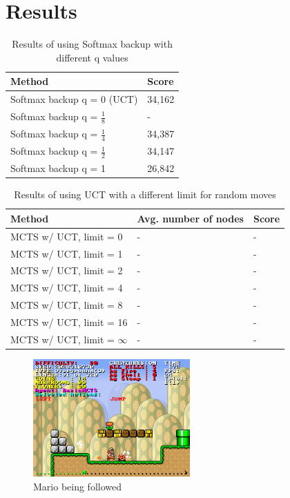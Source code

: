 \documentclass[10pt,a4paper]{article}
\begin{document}
\section{Results}
\renewcommand{\arraystretch}{1.5}

\begin{table}[h]
	\centering
\begin{tabular}{| l | l |}
	\hline
	\textbf{Method} & \textbf{Score} \\ \hline
	Softmax backup q = 0 (UCT) & 34,162 \\ \hline
	Softmax backup q = $\frac{1}{8}$ & - \\ \hline
	Softmax backup q = $\frac{1}{4}$ & 34,387 \\ \hline
	Softmax backup q = $\frac{1}{2}$ & 34,147 \\ \hline
	Softmax backup q = 1 & 26,842 \\ \hline
\end{tabular}
	\caption{Results of using Softmax backup with different q values}
	\label{tab:softmax_results}
\end{table}

\begin{table}[h]
	\centering
\begin{tabular}{| l | l | l |}
	\hline
	\textbf{Method} & \textbf{Avg. number of nodes} & \textbf{Score} \\ \hline
	MCTS w/ UCT, limit = 0			& - & - \\ \hline
	MCTS w/ UCT, limit = 1			& - & - \\ \hline
	MCTS w/ UCT, limit = 2			& - & - \\ \hline
	MCTS w/ UCT, limit = 4			& - & - \\ \hline
	MCTS w/ UCT, limit = 8			& - & - \\ \hline
	MCTS w/ UCT, limit = 16			& - & - \\ \hline
	MCTS w/ UCT, limit = $\infty$	& - & - \\ \hline
\end{tabular}
	\caption{Results of using UCT with a different limit for random moves}
	\label{tab:uct_results}
\end{table}

\begin{figure}[h]
\centering
\includegraphics[width=6cm]{img/Forfulgt}
\caption{Mario being followed}
\label{fig:followed}
\end{figure}
\end{document}
